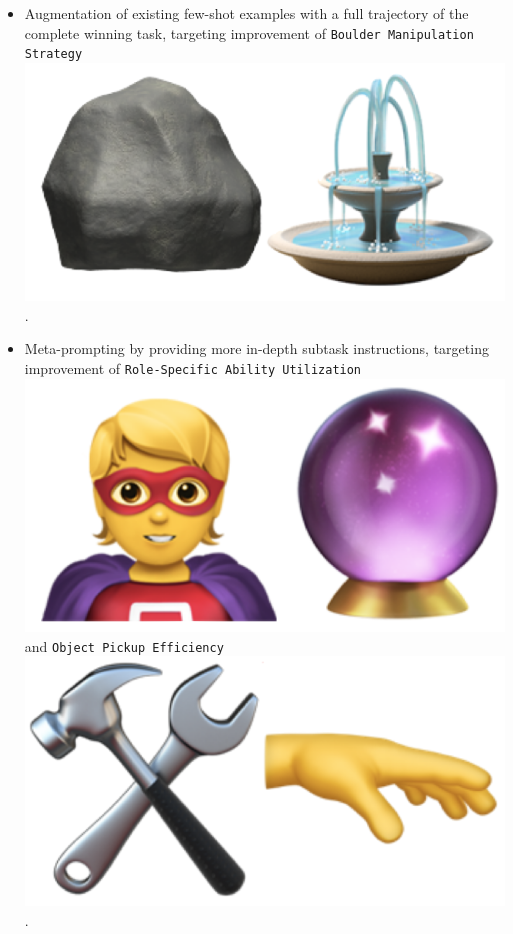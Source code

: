 \begin{flushleft}
\begin{itemize}
		\item Augmentation of existing few-shot examples with a full trajectory of the
			complete winning task, targeting improvement of \texttt{Boulder
			Manipulation Strategy}
			\includegraphics[scale=0.05]{figs/emojis/mini_4.png}
			.

		\item Meta-prompting by providing more in-depth subtask instructions,
			targeting improvement of \texttt{Role-Specific Ability Utilization}
			\includegraphics[scale=0.05]{figs/emojis/mini_6.png}
			and \texttt{Object Pickup Efficiency}
			\includegraphics[scale=0.05]{figs/emojis/mini_8.png}
			.
	\end{itemize}


\end{flushleft}
